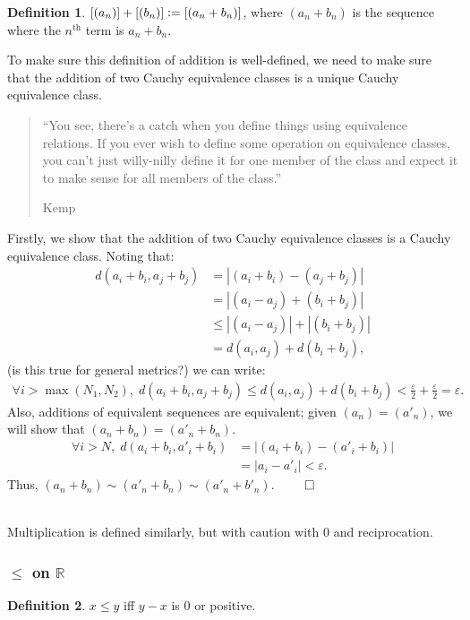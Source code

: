 \documentclass{article}
\newcommand{\vc}{\vcentcolon}
\theoremstyle{definition}
\newtheorem{defn}{Definition}[subsubsection]
\begin{document}
\begin{defn}
	$[(a_n)]+[(b_n)]\vc=[(a_n+b_n)]$, where $(a_n+b_n)$ is the sequence where the $n^\text{th}$ term is $a_n+b_n$.
\end{defn}
To make sure this definition of addition is well-defined, we need to make sure that the addition of two Cauchy equivalence classes is a unique Cauchy equivalence class.
\begin{quotation}
	``You see, there’s a catch when you define things using
equivalence relations. If you ever wish to define some operation on equivalence classes, you can’t
just willy-nilly define it for one member of the class and expect it to make sense for all members of
the class.''
	\begin{flushright}
		Kemp \cite[6]{Kemp2016CAUCHYSCO}
	\end{flushright}
\end{quotation}

Firstly, we show that the addition of two Cauchy equivalence classes is a Cauchy equivalence class. Noting that:
\begin{align*}
	d(a_i+b_i,a_j+b_j)&=|(a_i+b_i)-(a_j+b_j)|\\
	&=|(a_i-a_j)+(b_i+b_j)|\\
	&\leq|(a_i-a_j)|+|(b_i+b_j)|\\
	&=d(a_i,a_j)+d(b_i+b_j),
\end{align*}
(is this true for general metrics?) we can write:
\begin{align*}
	\forall i>\max(N_1,N_2),\; d(a_i+b_i,a_j+b_j)\leq d(a_i,a_j)+d(b_i+b_j)<\frac{\varepsilon}{2}+\frac{\varepsilon}{2}=\varepsilon.
\end{align*}
Also, additions of equivalent sequences are equivalent; given $(a_n)=(a'_n)$, we will show that $(a_n+b_n)=(a'_n+b_n)$.
\begin{align*}
	\forall i>N,\;d(a_i+b_i,a'_i+b_i)&=|(a_i+b_i)-(a'_i+b_i)|\\
	&=|a_i-a'_i|<\varepsilon.
\end{align*}
Thus, $(a_n+b_n)\sim(a'_n+b_n)\sim(a'_n+b'_n)$.\hspace*{\fill} \raggedleft$\qed$\raggedright\\
Multiplication is defined similarly, but with caution with 0 and reciprocation.
\subsubsection{\texorpdfstring{$\leq$}{leq} on \texorpdfstring{$\mathbb{R}$}{mathbb{R}}}
\begin{defn}
	$x\leq y$ iff $y-x$ is 0 or positive.
\end{defn}
\end{document}
